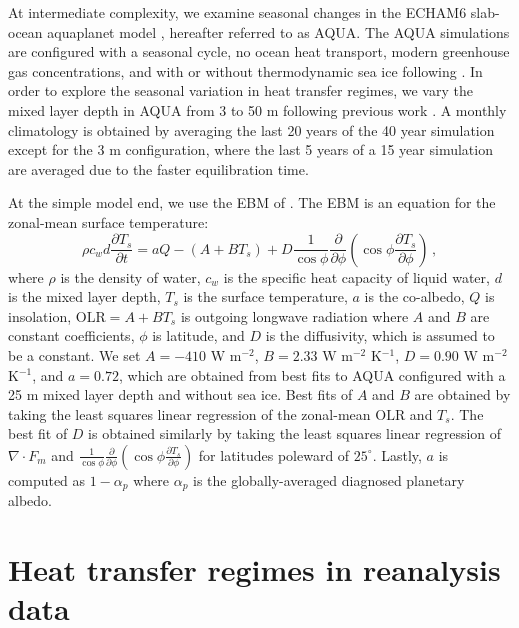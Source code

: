 \documentclass{ametsocV5}
\begin{document}
    At intermediate complexity, we examine seasonal changes in the ECHAM6 slab-ocean aquaplanet model \citep{stevens2013}, hereafter referred to as AQUA. The AQUA simulations are configured with a seasonal cycle, no ocean heat transport, modern greenhouse gas concentrations, and with or without thermodynamic sea ice following \cite{shaw2020}. In order to explore the seasonal variation in heat transfer regimes, we vary the mixed layer depth in AQUA from 3 to 50 m following previous work \citep{donohoe2013, barpanda2020}. A monthly climatology is obtained by averaging the last 20 years of the 40 year simulation except for the 3 m configuration, where the last 5 years of a 15 year simulation are averaged due to the faster equilibration time.
    

    At the simple model end, we use the EBM of \cite{rose2017}. The EBM is an equation for the zonal-mean surface temperature:
    \begin{equation}
      \rho c_w d \frac{\partial T_s}{\partial t} = aQ - (A+BT_s)  + D \frac{1}{\cos\phi}\frac{\partial}{\partial \phi}\left( \cos\phi \frac{\partial T_s}{\partial \phi} \right)\, ,
    \end{equation}
    where $\rho$ is the density of water, $c_w$ is the specific heat capacity of liquid water, $d$ is the mixed layer depth, $T_s$ is the surface temperature, $a$ is the co-albedo, $Q$ is insolation, $\mathrm{OLR}=A+BT_s$ is outgoing longwave radiation where $A$ and $B$ are constant coefficients, $\phi$ is latitude, and $D$ is the diffusivity, which is assumed to be a constant. We set $A=-410$ W m$^{-2}$, $B=2.33$ W m$^{-2}$ K$^{-1}$, $D=0.90$ W m$^{-2}$ K$^{-1}$, and $a=0.72$, which are obtained from best fits to AQUA configured with a 25 m mixed layer depth and without sea ice. Best fits of $A$ and $B$ are obtained by taking the least squares linear regression of the zonal-mean $\mathrm{OLR}$ and $T_s$. The best fit of $D$ is obtained similarly by taking the least squares linear regression of $\nabla\cdot F_m$ and $\frac{1}{\cos\phi}\frac{\partial}{\partial \phi} \left( \cos\phi \frac{\partial T_s}{\partial \phi} \right)$ for latitudes poleward of $25^\circ$. Lastly, $a$ is computed as $1-\alpha_p$ where $\alpha_p$ is the globally-averaged diagnosed planetary albedo.

\section{Heat transfer regimes in reanalysis data} \label{sec:diagnostics}
\end{document}
